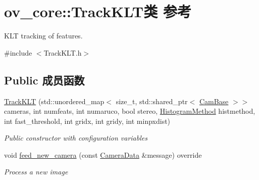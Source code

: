 \hypertarget{classov__core_1_1TrackKLT}{}\section{ov\+\_\+core\+:\+:Track\+K\+L\+T类 参考}
\label{classov__core_1_1TrackKLT}


K\+LT tracking of features.  




{\ttfamily \#include $<$Track\+K\+L\+T.\+h$>$}

\subsection*{Public 成员函数}
\begin{DoxyCompactItemize}
\item 
\hyperlink{classov__core_1_1TrackKLT_acb59382fb0893c546e612fa20ca0672b}{Track\+K\+LT} (std\+::unordered\+\_\+map$<$ size\+\_\+t, std\+::shared\+\_\+ptr$<$ \hyperlink{classov__core_1_1CamBase}{Cam\+Base} $>$$>$ cameras, int numfeats, int numaruco, bool stereo, \hyperlink{classov__core_1_1TrackBase_aa4b34a5dce99b59522d57bf9278c9a1a}{Histogram\+Method} histmethod, int fast\+\_\+threshold, int gridx, int gridy, int minpxdist)
\begin{DoxyCompactList}\small\item\em Public constructor with configuration variables \end{DoxyCompactList}\item 
void \hyperlink{classov__core_1_1TrackKLT_a8cb9c3595fbbddc9a563137cd06b07cf}{feed\+\_\+new\+\_\+camera} (const \hyperlink{structov__core_1_1CameraData}{Camera\+Data} \&message) override
\begin{DoxyCompactList}\small\item\em Process a new image \end{DoxyCompactList}\end{DoxyCompactItemize}
